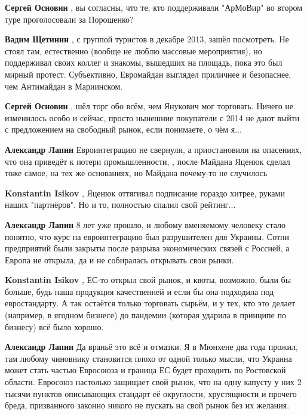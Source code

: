 \begin{itemize}
\begin{itemize}
\textbf{Сергей Основин} , вы согласны, что те, кто поддерживали "АрМоВир" во втором туре проголосовали за Порошенко?

\textbf{Вадим Щетинин} , с группой туристов в декабре 2013, зашёл посмотреть. Не стоял там, естественно (вообще не люблю массовые мероприятия), но поддерживал своих коллег и знакомы, вышедших на площадь, пока это был мирный протест. Субъективно, Евромайдан выглядел приличнее и безопаснее, чем Антимайдан в Мариинском.

\textbf{Сергей Основин} , шёл торг обо всём, чем Янукович мог торговать. Ничего не изменилось особо и сейчас, просто нынешние покупатели с 2014 не дают выйти с предложением на свободный рынок, если понимаете, о чём я...

\textbf{Александр Лапин} Евроинтеграцию не свернули, а приостановили на опасениях, что она приведёт к потери промышленности, , после Майдана Яценюк сделал тоже самое, на тех же основаниях, но Майдана почему-то не случилось

\textbf{Konstantin Isikov} , Яценюк оттягивал подписание гораздо хитрее, руками наших "партнёров". Но и то, полностью спалил свой рейтинг...

\textbf{Александр Лапин} 8 лет уже прошло, и любому вменяемому человеку стало понятно, что курс на евроинтеграцию был разрушителен для Украины. Сотни предприятий были закрыты после разрыва экономических связей с Россией, а Европа не открыла, да и не собиралась открывать свои рынки.

\textbf{Konstantin Isikov} , ЕС-то открыл свой рынок, и квоты, возможно, были бы больше, будь наша продукция качественней и если бы она подходила под евростандарту. А так остаётся только торговать сырьём, и у тех, кто это делает (например, в ягодном бизнесе) до пандемии (которая ударила в принципе по бизнесу) всё было хорошо.

\textbf{Александр Лапин} Да враньё это всё и отмазки. Я в Мюнхене два года прожил, там любому чиновнику становится плохо от одной только мысли, что Украина может стать частью Евросоюза и граница ЕС будет проходить по Ростовской области.
Евросоюз настолько защищает свой рынок, что на одну капусту у них 2 тысячи пунктов описывающих стандарт её округлости, хрустящности и прочего бреда, призванного законно никого не пускать на свой рынок без их желания.


\end{itemize}
\end{itemize}
